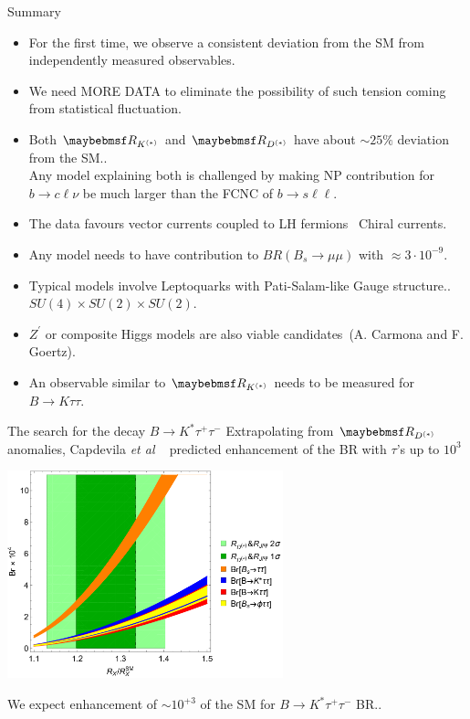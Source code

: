 \documentclass[9pt,usenames,dvipsnames]{beamer}
\begin{document}
%
%
\begin{frame}{Summary }
	\begin{itemize}
		\item For the first time, we observe a consistent deviation from the SM from independently measured observables. \pause
		\item We need MORE DATA to eliminate the possibility of such tension coming from  statistical fluctuation. \pause
		\item Both $\RK$ and $\RD$ have about $\sim 25\%$ deviation from the SM.. \\ Any model explaining both is challenged by making NP  contribution for $b\to c\ell\nu$ be much larger than the FCNC of $ b \to s \ell \ell $. \pause
		\item The data favours vector currents coupled to LH fermions~ Chiral currents. \pause
		\item Any model needs to have contribution to $BR( B_s \to \mu \mu)$ with $ \approx 3\cdot 10^{-9}$.  \pause
		\item Typical models involve Leptoquarks with Pati-Salam-like Gauge structure.. $SU(4)\times SU(2)\times SU(2)$. \pause
		\item $Z^\prime$ or composite Higgs models are also viable candidates~(A. Carmona and F. Goertz). \pause
		\item  \alert{An observable similar to $\RK$ needs to be measured for $ B \to K \tau \tau$}.  
	\end{itemize}
\end{frame}
\begin{frame}{The search for the decay $ B \to K^* \tau^+ \tau^-$ }
Extrapolating from $\RD$ anomalies, Capdevila \textit{et al }~ predicted enhancement of the BR with $\tau$'s up to $10^3$
	\begin{center}
		\includegraphics[width= 0.6\textwidth]{./assets/RX} 
	\end{center}
	\pause
	We expect enhancement of $\sim 10^{+3}$ of the SM for $ B \to K^* \tau^+ \tau^-$ BR..
\end{frame}
\end{document}
